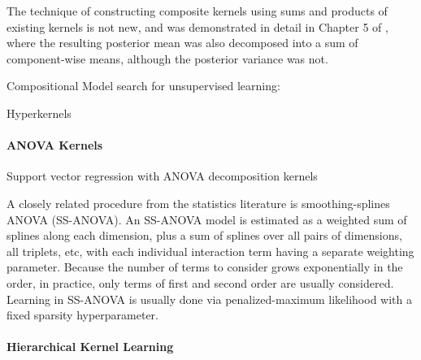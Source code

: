 \documentclass[twoside]{article}
\begin{document}
The technique of constructing composite kernels using sums and products of existing kernels is not new, and was demonstrated in detail in Chapter 5 of \cite{rasmussen38gaussian}, where the resulting posterior mean was also decomposed into a sum of component-wise means, although the posterior variance was not.

Compositional Model search for unsupervised learning: \cite{grosse2012exploiting}

Hyperkernels \cite{ong2002hyperkernels}

\paragraph{ANOVA Kernels}

Support vector regression with ANOVA decomposition kernels \cite{stitson1999support}

A closely related procedure from the statistics literature is smoothing-splines ANOVA (SS-ANOVA)\cite{wahba1990spline, gu2002smoothing}.
An SS-ANOVA model is estimated as a weighted sum of splines along each dimension, plus a sum of splines over all pairs of dimensions, all triplets, etc, with each individual interaction term having a separate weighting parameter.
Because the number of terms to consider grows exponentially in the order, in practice, only terms of first and second order are usually considered.
Learning in SS-ANOVA is usually done via penalized-maximum likelihood with a fixed sparsity hyperparameter.

\paragraph{Hierarchical Kernel Learning}
\end{document}
